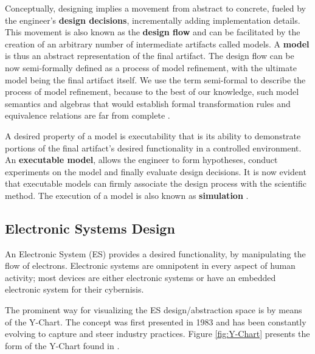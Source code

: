 \documentclass[12pt,twoside]{article}
\begin{document}
Conceptually, designing implies a movement from abstract to concrete, fueled by the engineer's \textbf{design decisions}, incrementally adding implementation details.
This movement is also known as the \textbf{design flow} and can be facilitated by the creation of an arbitrary number of intermediate artifacts called models.
A \textbf{model} is thus an abstract representation of the final artifact. 
The design flow can be now semi-formally defined as a process of model refinement, with the ultimate model being the final artifact itself.
We use the term semi-formal to describe the process of model refinement, because to the best of our knowledge, 
such model semantics and algebras that would establish formal transformation rules and equivalence relations are far from complete \cite{Gajski2009}.

A desired property of a model is executability that is its ability to demonstrate portions of the final artifact's desired functionality in a controlled environment.
An \textbf{executable model}, allows the engineer to form hypotheses, conduct experiments on the model and finally evaluate design decisions.
It is now evident that executable models can firmly associate the design process with the scientific method.
The execution of a model is also known as \textbf{simulation} \cite{Editor2014}.


\subsection{Electronic Systems Design}
\label{sec-3-2}
An Electronic System (ES) provides a desired functionality, by manipulating the flow of electrons.
Electronic systems are omnipotent in every aspect of human activity; 
most devices are either electronic systems or have an embedded electronic system for their cybernisis.

The prominent way for visualizing the ES design/abstraction space is by means of the Y-Chart.
The concept was first presented in 1983 \cite{Gajski1983} and has been constantly evolving to capture and steer industry practices.
Figure \ref{fig:Y-Chart} presents the form of the Y-Chart found in \cite{Gajski2009}.
\end{document}
